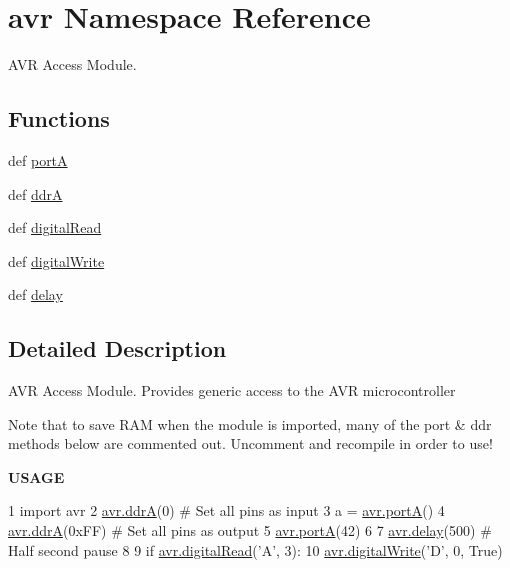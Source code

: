 \hypertarget{namespaceavr}{\section{avr Namespace Reference}
\label{namespaceavr}
}


A\-V\-R Access Module.  


\subsection*{Functions}
\begin{DoxyCompactItemize}
\item 
def \hyperlink{namespaceavr_ae5e4d944d11af88503bca4bc38c8ad24}{port\-A}
\item 
def \hyperlink{namespaceavr_acd36edac7e5acb37cf8e0875251a71a6}{ddr\-A}
\item 
def \hyperlink{namespaceavr_aab653e9f85add17b0055f36dcba2a24d}{digital\-Read}
\item 
def \hyperlink{namespaceavr_a222fdb00cfa9f89c1c3771fbae3a86bc}{digital\-Write}
\item 
def \hyperlink{namespaceavr_aacfd02ad9a2c5f7b4ad3e3a76b5c85de}{delay}
\end{DoxyCompactItemize}


\subsection{Detailed Description}
A\-V\-R Access Module. Provides generic access to the A\-V\-R microcontroller

Note that to save R\-A\-M when the module is imported, many of the port \& ddr methods below are commented out. Uncomment and recompile in order to use!

{\bfseries U\-S\-A\-G\-E}


\begin{DoxyCode}
1 \textcolor{keyword}{import} avr
2 \hyperlink{namespaceavr_acd36edac7e5acb37cf8e0875251a71a6}{avr.ddrA}(0) \textcolor{comment}{# Set all pins as input}
3 a = \hyperlink{namespaceavr_ae5e4d944d11af88503bca4bc38c8ad24}{avr.portA}()
4 \hyperlink{namespaceavr_acd36edac7e5acb37cf8e0875251a71a6}{avr.ddrA}(0xFF) \textcolor{comment}{# Set all pins as output}
5 \hyperlink{namespaceavr_ae5e4d944d11af88503bca4bc38c8ad24}{avr.portA}(42)
6 
7 \hyperlink{namespaceavr_aacfd02ad9a2c5f7b4ad3e3a76b5c85de}{avr.delay}(500) \textcolor{comment}{# Half second pause}
8 
9 \textcolor{keywordflow}{if} \hyperlink{namespaceavr_aab653e9f85add17b0055f36dcba2a24d}{avr.digitalRead}(\textcolor{stringliteral}{'A'}, 3):
10   \hyperlink{namespaceavr_a222fdb00cfa9f89c1c3771fbae3a86bc}{avr.digitalWrite}(\textcolor{stringliteral}{'D'}, 0, \textcolor{keyword}{True})
\end{DoxyCode}
 

